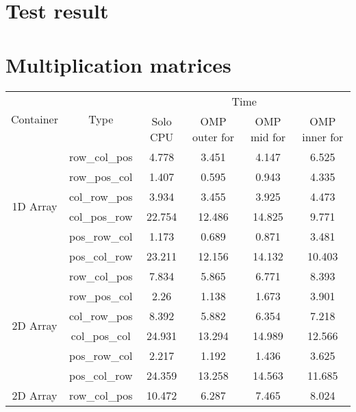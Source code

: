 \documentclass[11pt]{article}
\begin{document}
\pagestyle{empty}
\begin{center}
\section*{\huge{Test result}}
\section*{Multiplication matrices}
\end{center}
\begin{table}[H]
\centering
\begin{tabular}{ |c|c|c|c|c|c|  }
\hline 
\multirow{2}{*}{Container}  & \multirow{2}{*}{Type} & \multicolumn{4}{c|}{ Time} \\  \cline{3-6}

                            &                       &  Solo CPU& OMP outer for & OMP mid for & OMP inner for \\ 
\hline 
\multirow{6}{*}{1D Array}   & row\_col\_pos & 4.778 &  3.451 & 4.147 & 6.525 \\
                            & row\_pos\_col & 1.407 &  0.595 & 0.943 & 4.335 \\
                            & col\_row\_pos & 3.934 &  3.455 & 3.925 & 4.473 \\  
                            & col\_pos\_row & 22.754 & 12.486 &  14.825 & 9.771 \\
                            & pos\_row\_col & 1.173 &  0.689 & 0.871 & 3.481 \\
                            & pos\_col\_row & 23.211 & 12.156 & 14.132 & 10.403 \\
\hline
\multirow{6}{*}{2D Array}   & row\_col\_pos & 7.834 &  5.865 &  6.771 &  8.393  \\
                            & row\_pos\_col & 2.26 &   1.138 &  1.673 &  3.901  \\
                            & col\_row\_pos & 8.392 &  5.882 &  6.354 &  7.218  \\  
                            & col\_pos\_col & 24.931 & 13.294 & 14.989 & 12.566 \\
                            & pos\_row\_col & 2.217 &  1.192 &  1.436 &  3.625  \\
                            & pos\_col\_row & 24.359 & 13.258 & 14.563 & 11.685 \\
\hline
\multirow{6}{*}{2D Array}   & row\_col\_pos & 10.472 & 6.287 & 7.465 & 8.024  \\ 

\end{tabular}
\end{table}
\end{document}
